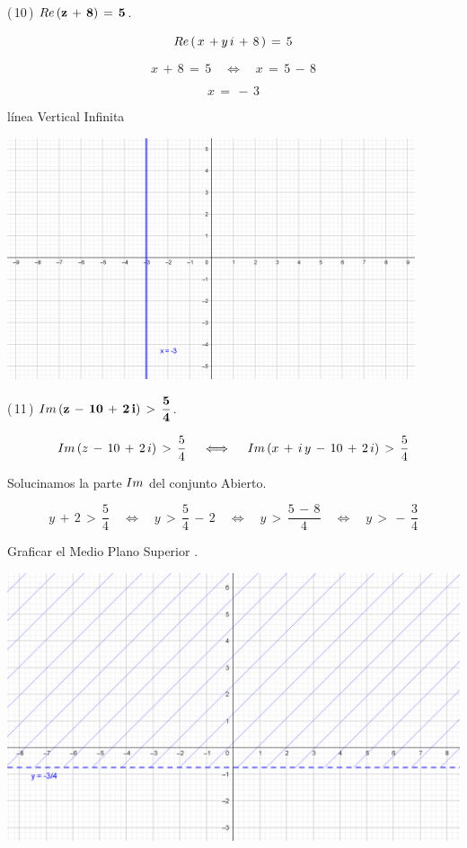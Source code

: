 \documentclass[a4paper,11pt,openany]{book}
\begin{document}
\textcolor{ao(english)}{(\,10\,)} $\bf{\mathnormal{Re}\,(z\,+\,8)\,=\,5}$.

$$\mathnormal{Re}\,(\,x\,+y\,i\,+\,8\,)\,=\,5$$

$$x\,+\,8\,=\,5 \quad\iff\quad x\,=\,5\,-\,8$$

$$x\,=\,-\,3$$

línea Vertical Infinita

\begin{center}
    \includegraphics[width=12cm]{Gra-Ej-10.png}
\end{center}

\textcolor{ao(english)}{(\,11\,)} $\bf{\mathnormal{Im}\,(z\,-\,10\,+\,2\,i)\,>\,\dfrac{5}{4}}$.

$$\mathnormal{Im}\,(z\,-\,10\,+\,2\,i)\,>\,\dfrac{5}{4} \quad\iff\quad  \mathnormal{Im}\,(x\,+\,i\,y\,-\,10\,+\,2\,i)\,>\,\dfrac{5}{4}$$

\textcolor{ao(english)}{} Solucinamos la parte $\mathnormal{Im}$ del conjunto Abierto.

$$y\,+\,2\,>\,\dfrac{5}{4} \quad\iff\quad y\,>\,\dfrac{5}{4}\,-\,2 \quad\iff\quad y\,>\,\dfrac{5\,-\,8}{4} \quad\iff\quad y\,>\,-\,\dfrac{3}{4}$$

\textcolor{ao(english)}{} Graficar el Medio Plano Superior .

\begin{center}
    \includegraphics[width=15cm]{Gra-Ej-11.png}
\end{center}
\end{document}

